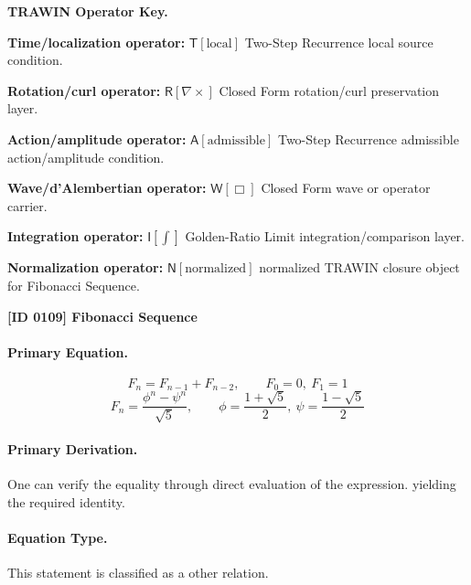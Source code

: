 \par\vspace{0.45\baselineskip}
\noindent\begin{minipage}[t]{\linewidth}
\begingroup
\small
\raggedright
\textbf{TRAWIN Operator Key.}\par
\noindent\textbf{Time/localization operator:} $\mathsf{T}\!\left[\mathrm{local}\right]$ Two-Step Recurrence local source condition.\par
\noindent\textbf{Rotation/curl operator:} $\mathsf{R}\!\left[\nabla\times\right]$ Closed Form rotation/curl preservation layer.\par
\noindent\textbf{Action/amplitude operator:} $\mathsf{A}\!\left[\mathrm{admissible}\right]$ Two-Step Recurrence admissible action/amplitude condition.\par
\noindent\textbf{Wave/d'Alembertian operator:} $\mathsf{W}\!\left[\Box\right]$ Closed Form wave or operator carrier.\par
\noindent\textbf{Integration operator:} $\mathsf{I}\!\left[\int\right]$ Golden-Ratio Limit integration/comparison layer.\par
\noindent\textbf{Normalization operator:} $\mathsf{N}\!\left[\mathrm{normalized}\right]$ normalized TRAWIN closure object for Fibonacci Sequence.\par
\endgroup
\end{minipage}

\clearpage
\noindent\textbf{[ID 0109] Fibonacci Sequence}\par
\vspace{0.35em}
\paragraph{Primary Equation.}
\[
F_n = F_{n-1}+F_{n-2},
\qquad
F_0=0,\ F_1=1
\]
\[
F_n = \frac{\phi^n-\psi^n}{\sqrt{5}},
\qquad
\phi=\frac{1+\sqrt{5}}{2},\ \psi=\frac{1-\sqrt{5}}{2}
\]

\paragraph{Primary Derivation.}
One can verify the equality through direct evaluation of the expression. yielding the required identity.
\paragraph{Equation Type.}
This statement is classified as a other relation.

